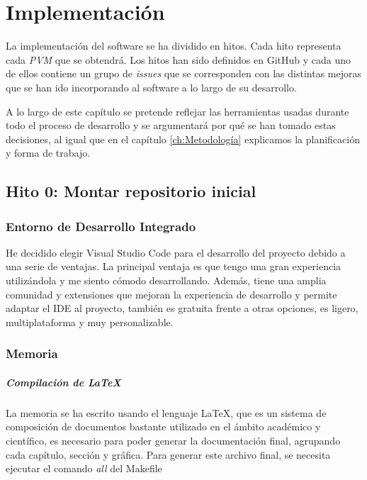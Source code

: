 \chapter{Implementación}

La implementación del software se ha dividido en hitos. Cada hito representa cada \textit{PVM} que se obtendrá.
Los hitos han sido definidos en GitHub y cada uno de ellos contiene un grupo de \textit{issues} que se corresponden
con las distintas mejoras que se han ido incorporando al software a lo largo de su desarrollo.

A lo largo de este capítulo se pretende reflejar las herramientas usadas durante todo el proceso de desarrollo y
se argumentará por qué se han tomado estas decisiones, al igual que en el capítulo \ref*{ch:Metodología} explicamos
la planificación y forma de trabajo.

\section{Hito 0: Montar repositorio inicial}

\subsection{Entorno de Desarrollo Integrado}
He decidido elegir Visual Studio Code para el desarrollo del proyecto debido a una serie de ventajas. La principal ventaja
es que tengo una gran experiencia utilizándola y me siento cómodo desarrollando. Además, tiene una amplia comunidad y
extensiones que mejoran la experiencia de desarrollo y permite adaptar el IDE al proyecto, también es gratuita frente
a otras opciones, es ligero, multiplataforma y muy personalizable.

\subsection{Memoria}

\paragraph*{Compilación de LaTeX}
La memoria se ha escrito usando el lenguaje LaTeX, que es un sistema de composición de documentos bastante utilizado
en el ámbito académico y científico, es necesario para poder generar la documentación final, agrupando cada capítulo, sección y
gráfica. Para generar este archivo final, se necesita ejecutar el comando \textit{all} del Makefile

